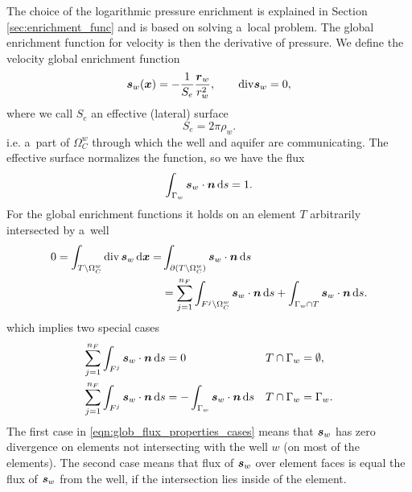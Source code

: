 The choice of the logarithmic pressure enrichment is explained in Section \ref{sec:enrichment_func} and
is based on solving a~local problem. The global enrichment function for velocity is then 
the derivative of pressure. We define the velocity global enrichment function
\begin{equation}
    \mathbf{\boldsymbol{s}}_w(\mathbf{\boldsymbol{x}}) = -\frac{1}{S_e} \frac{\mathbf{\boldsymbol{r}}_w}{r_w^2}, \qquad {\rm div} \mathbf{\boldsymbol{s}}_w = 0 \label{eqn:global_enr_vel},
\end{equation}
where we call $S_e$ an effective (lateral) surface
\begin{equation}
S_e = 2\pi\rho_w.
\end{equation}
i.e. a~part of $\Omega^w_C$ through which the well and aquifer are communicating.
The effective surface normalizes the function, so we have the flux
\begin{equation}
\int_{\Gamma_w} \mathbf{\boldsymbol{s}}_w\cdot \mathbf{\boldsymbol{n}} \,{\rm d} s = 1.
\end{equation}
%
For the global enrichment functions it holds on an element $T$ arbitrarily intersected by a~well
\begin{align}
0 = \int_{T\setminus\Omega^w_C} {\rm div}\,\mathbf{\boldsymbol{s}}_w \,{\rm d}\mathbf{\boldsymbol{x}} = & \int_{\partial (T\setminus\Omega^w_C)} \mathbf{\boldsymbol{s}}_w\cdot\mathbf{\boldsymbol{n}} \,{\rm d} s \nonumber\\
    &= \sum \limits_{j=1}^{n_F} \int_{F^j\setminus \Omega^w_C} \mathbf{\boldsymbol{s}}_w\cdot\mathbf{\boldsymbol{n}} \,{\rm d} s 
      + \int_{\Gamma_w\cap T} \mathbf{\boldsymbol{s}}_w\cdot\mathbf{\boldsymbol{n}} \,{\rm d} s. \label{eqn:glob_flux_properties}
\end{align}
which implies two special cases
\begin{align} \label{eqn:glob_flux_properties_cases}
        \sum \limits_{j=1}^{n_F} \int_{F^j} \mathbf{\boldsymbol{s}}_w\cdot\mathbf{\boldsymbol{n}} \,{\rm d} s &= 0
            && T \cap \Gamma_w=\emptyset, \\
        \sum \limits_{j=1}^{n_F} \int_{F^j} \mathbf{\boldsymbol{s}}_w\cdot\mathbf{\boldsymbol{n}} \,{\rm d} s
            &= - \int_{\Gamma_w} \mathbf{\boldsymbol{s}}_w\cdot\mathbf{\boldsymbol{n}} \,{\rm d} s
            && T \cap \Gamma_w=\Gamma_w.
\end{align}
The first case in \eqref{eqn:glob_flux_properties_cases} means that $\mathbf{\boldsymbol{s}}_w$ has zero divergence on elements
not intersecting with the well $w$ (on most of the elements). The second case means that flux of $\mathbf{\boldsymbol{s}}_w$ over element faces
is equal the flux of $\mathbf{\boldsymbol{s}}_w$ from the well, if the intersection lies inside of the element.

